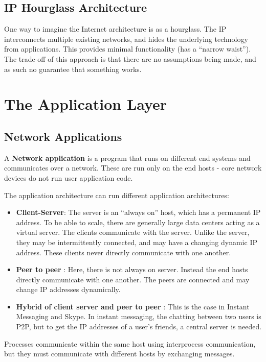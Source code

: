 \documentclass[12pt,letterpaper]{article}
\theoremstyle{definition}
\begin{document}
\subsection{IP Hourglass Architecture}

One way to imagine the Internet architecture is as a hourglass. The IP interconnects multiple existing networks, and hides the underlying technology from applications. This provides minimal functionality (has a ``narrow waist''). The trade-off of this approach is that there are no assumptions being made, and as such no guarantee that something works.

\section{The Application Layer}

\subsection{Network Applications}

A \textbf{Network application} is a program that runs on different end systems and communicates over a network. These are run only on the end hosts - core network devices do not run user application code.

The application architecture can run different application architectures:

\begin{itemize}
  \item \textbf{Client-Server}: The server is an ``always on'' host, which has a permanent IP address. To be able to scale, there are generally large data centers acting as a virtual server. The clients communicate with the server. Unlike the server, they may be intermittently connected, and may have a changing dynamic IP address. These clients never directly communicate with one another.
  \item \textbf{Peer to peer} : Here, there is not always on server. Instead the end hosts directly communicate with one another. The peers are connected and may change IP addresses dynamically.
  \item \textbf{Hybrid of client server and peer to peer} : This is the case in Instant Messaging and Skype. In instant messaging, the chatting between two users is P2P, but to get the IP addresses of a user's friends, a central server is needed.
\end{itemize}

Processes communicate within the same host using interprocess communication, but they must communicate with different hosts by exchanging messages.
\end{document}
